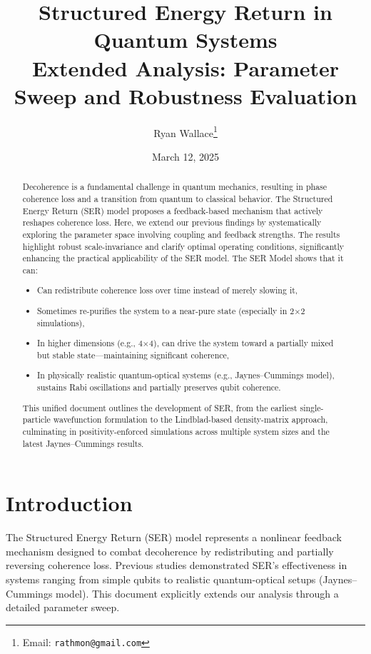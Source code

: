 \documentclass{article}
\title{Structured Energy Return in Quantum Systems\\
\large Extended Analysis: Parameter Sweep and Robustness Evaluation}
\author{Ryan Wallace\thanks{Email: \texttt{rathmon@gmail.com}}}
\date{March 12, 2025}
\begin{document}
\maketitle

\begin{abstract}
Decoherence is a fundamental challenge in quantum mechanics, resulting in phase coherence loss and a transition from quantum to classical behavior. The Structured Energy Return (SER) model proposes a feedback-based mechanism that actively reshapes coherence loss. Here, we extend our previous findings by systematically exploring the parameter space involving coupling and feedback strengths. The results highlight robust scale-invariance and clarify optimal operating conditions, significantly enhancing the practical applicability of the SER model. The SER Model shows that it can:
\begin{itemize}
\item Can redistribute coherence loss over time instead of merely slowing it,
\item Sometimes re-purifies the system to a near-pure state (especially in 2$\times$2 simulations),
\item In higher dimensions (e.g., 4$\times$4), can drive the system toward a partially mixed but stable state---maintaining significant coherence,
\item In physically realistic quantum-optical systems (e.g., Jaynes--Cum\-mings model), sustains Rabi oscillations and partially preserves qubit coherence.
\end{itemize}
This unified document outlines the development of SER, from the earliest single-particle wavefunction formulation to the Lindblad-based density-matrix approach, culminating in positivity-enforced simulations across multiple system sizes and the latest Jaynes--Cummings results.
\end{abstract}

\section{Introduction}
The Structured Energy Return (SER) model represents a nonlinear feedback mechanism designed to combat decoherence by redistributing and partially reversing coherence loss. Previous studies demonstrated SER's effectiveness in systems ranging from simple qubits to realistic quantum-optical setups (Jaynes–Cum\-mings model). This document explicitly extends our analysis through a detailed parameter sweep.
\end{document}
